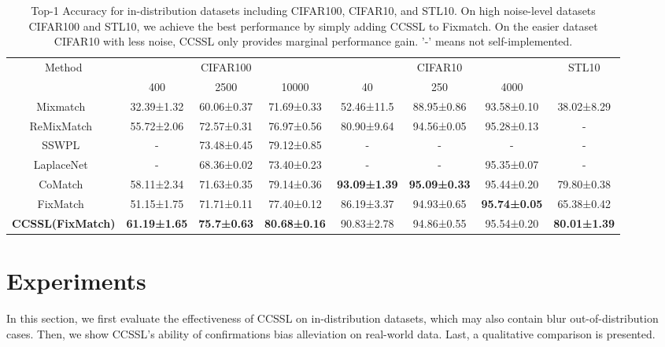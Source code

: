 \documentclass[10pt,twocolumn,letterpaper]{article}
\begin{document}
\begin{table*}[t]
\centering
\small

\begin{tabular}{c|ccc|ccc|c}
\toprule
    \multirow{2}{*}{Method} &
    \multicolumn{3}{c|}{CIFAR100} & 
    \multicolumn{3}{c|}{CIFAR10} & STL10 \\
\cline{2-8}
 & 400 & 2500 & 10000 & 40 & 250 & 4000 &  \\
\midrule
 Mixmatch~\cite{berthelot2019mixmatch} & 32.39±1.32 & 60.06±0.37 & 71.69±0.33 & 52.46±11.5 & 88.95±0.86 & 93.58±0.10 & 38.02±8.29 \\
 ReMixMatch~\cite{berthelot2019remixmatch}& 55.72±2.06 & 72.57±0.31 & 76.97±0.56 & 80.90±9.64 & 94.56±0.05 & 95.28±0.13 & - \\
 SSWPL~\cite{taherkhani2021self} & - & 73.48±0.45 & 79.12±0.85 & - & - & - & - \\
LaplaceNet~\cite{sellars2021laplacenet} & - & 68.36±0.02 & 73.40±0.23 & - & - & 95.35±0.07 & - \\
 CoMatch~\cite{li2021comatch} & 58.11±2.34 & 71.63±0.35 & 79.14±0.36 & \textbf{93.09±1.39} & \textbf{95.09±0.33} & 95.44±0.20 & 79.80±0.38 \\
 FixMatch~\cite{li2021comatch} & 51.15±1.75 & 71.71±0.11 & 77.40±0.12 & 86.19±3.37 & 94.93±0.65 & \textbf{95.74±0.05} & 65.38±0.42 \\
 \hline
 \textbf{CCSSL(FixMatch)} & \textbf{61.19±1.65} & \textbf{75.7±0.63} & \textbf{80.68±0.16} & 90.83±2.78 & 94.86±0.55 & 95.54±0.20 & \textbf{80.01±1.39} \\
\bottomrule
\end{tabular}
\caption{Top-1 Accuracy for in-distribution datasets including CIFAR100, CIFAR10, and STL10. On high noise-level datasets CIFAR100 and STL10, we achieve the best performance by simply adding CCSSL to Fixmatch. On the easier dataset CIFAR10 with less noise, CCSSL only provides marginal performance gain. '-' means not self-implemented.}
\label{tab:in-distribution-data}
\end{table*}



\section{Experiments} \label{sec:experiments}
In this section, we first evaluate the effectiveness of CCSSL on in-distribution datasets, which may also contain blur out-of-distribution cases. Then, we show CCSSL's ability of confirmations bias alleviation on real-world data. Last, a qualitative comparison is presented. 
\end{document}
